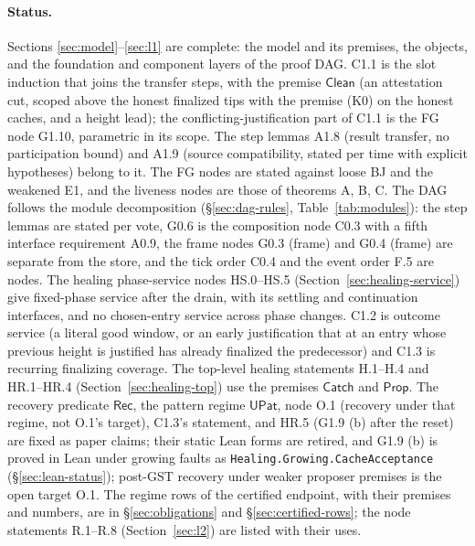 \documentclass{article}
\begin{document}
\paragraph{Status.}  Sections \ref{sec:model}--\ref{sec:l1}
are complete: the model and its premises, the objects, and
the foundation and component layers of the proof DAG.  C1.1 is the slot
induction that joins the transfer steps, with the premise $\mathsf{Clean}$
(an attestation cut, scoped above the honest finalized tips with the premise
(K0) on the honest caches, and a height lead); the conflicting-justification
part of C1.1 is the FG node G1.10, parametric in its scope.  The step lemmas
A1.8 (result transfer, no participation bound) and A1.9 (source
compatibility, stated per time with explicit hypotheses) belong to it.  The
FG nodes are stated against loose BJ and the weakened E1, and the liveness
nodes are those of theorems A, B, C.  The DAG follows
the module decomposition (\S\ref{sec:dag-rules}, Table~\ref{tab:modules}): the
step lemmas are stated per vote, G0.6 is the composition node C0.3 with a
fifth interface requirement A0.9, the frame nodes G0.3 (frame) and G0.4 (frame)
are separate from the store, and the tick order C0.4 and the event order F.5 are
nodes.  The healing
phase-service nodes HS.0--HS.5 (Section~\ref{sec:healing-service}) give
fixed-phase service after the drain, with its settling and continuation
interfaces, and no chosen-entry service across phase changes.  C1.2 is
outcome service (a literal good window, or an early justification that
at an entry whose previous height is justified has already finalized the
predecessor) and C1.3 is recurring finalizing coverage.  The top-level
healing statements H.1--H.4 and HR.1--HR.4 (Section~\ref{sec:healing-top})
use the premises $\mathsf{Catch}$ and
$\mathsf{Prop}$.  The recovery predicate $\mathsf{Rec}$, the
pattern regime $\mathsf{UPat}$, node O.1 (recovery under that regime, not O.1's
target), C1.3's statement, and HR.5 (G1.9 (b) after the reset) are fixed as paper
claims; their static Lean forms are retired, and G1.9 (b) is proved in Lean
under growing faults as \texttt{Healing.Growing.CacheAcceptance}
(\S\ref{sec:lean-status});
post-GST recovery under weaker proposer premises is the open target O.1.
The regime rows of the certified endpoint, with their premises and
numbers, are in \S\ref{sec:obligations} and \S\ref{sec:certified-rows};
the node statements R.1--R.8 (Section~\ref{sec:l2}) are listed with their
uses.
\end{document}
